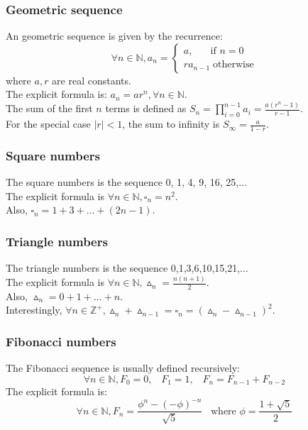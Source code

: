 \documentclass[12pt]{article}
\begin{document}
\subsubsection{Geometric sequence}
An geometric sequence is given by the recurrence:
\[
\forall n\in\mathbb{N}, a_n=\begin{cases}
        a,\;\;\;\;\;\text{ if }n=0\\
        ra_{n-1}\;\text{otherwise}
        \end{cases}
\]
where $a,r$ are real constants.\\
The explicit formula is: $a_n = ar^n,\forall n\in\mathbb{N}$.\\
The sum of the first $n$ terms is defined as $S_n=\prod^{n-1}_{i=0}a_i=\frac{a(r^n-1)}{r-1}$.\\
For the special case $|r|<1$, the sum to infinity is $S_\infty = \frac{a}{1-r}$.
\subsubsection{Square numbers}
The square numbers is the sequence 0, 1, 4, 9, 16, 25,$\ldots$\\
The explicit formula is $\forall n\in\mathbb{N}, \square_{n}=n^2$.\\
Also, $\square_{n}=1+3+\ldots+(2n-1)$.
\subsubsection{Triangle numbers}
The triangle numbers is the sequence 0,1,3,6,10,15,21,$\ldots$\\
The explicit formula is $\forall n\in\mathbb{N}, \vartriangle_n = \frac{n(n+1)}{2}$.\\
Also, $\vartriangle_n = 0+1+\ldots+n$.\\
Interestingly, $\forall n\in\mathbb{Z}^+, \vartriangle_n+\vartriangle_{n-1}=\square_n = (\vartriangle_n-\vartriangle_{n-1})^2$.
\subsubsection{Fibonacci numbers}
The Fibonacci sequence is usually defined recursively:
\[
\forall n\in\mathbb{N}, F_0=0,\;\;\;F_1=1,\;\;\;F_n=F_{n-1}+F_{n-2}
\]
The explicit formula is:
\[
\forall n\in\mathbb{N}, F_n = \frac{\phi^n-(-\phi)^{-n}}{\sqrt{5}}\;\;\;\text{where }\phi = \frac{1+\sqrt{5}}{2}
\]
\end{document}
